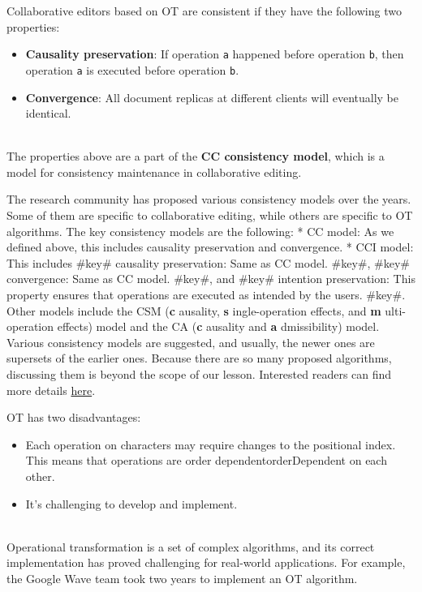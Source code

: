 Collaborative editors based on OT are consistent if they have the following two properties:

\begin{itemize}
\item
\protect{}\label{6J2W0HQeIjtGxqpABTopm}
\textbf{Causality preservation}: If operation \texttt{a} happened before operation \texttt{b}, then operation \texttt{a} is executed before operation \texttt{b}.
\item
\protect{}\label{DgY5Z2OVVujAPT_cXY392}
\textbf{Convergence}: All document replicas at different clients will eventually be identical.
\end{itemize}
\\
The properties above are a part of the \textbf{CC consistency model}, which is a model for consistency maintenance in collaborative editing.

The research community has proposed various consistency models over the years. Some of them are specific to collaborative editing, while others are specific to OT algorithms. The key consistency models are the following: * CC model: As we defined above, this includes causality preservation and convergence. * CCI model: This includes \#key\# causality preservation: Same as CC model. \#key\#, \#key\# convergence: Same as CC model. \#key\#, and \#key\# intention preservation: This property ensures that operations are executed as intended by the users. \#key\#.
\\
Other models include the CSM (\textbf{c} ausality, \textbf{s} ingle-operation effects, and \textbf{m} ulti-operation effects) model and the CA (\textbf{c} ausality and \textbf{a} dmissibility) model.
\\
Various consistency models are suggested, and usually, the newer ones are supersets of the earlier ones. Because there are so many proposed algorithms, discussing them is beyond the scope of our lesson. Interested readers can find more details \href{https://dl.acm.org/doi/pdf/10.1145/289444.289469}{here}.

OT has two disadvantages:

\begin{itemize}
\item
\protect{}\label{AAdxsuJ2sIQBxAqGSMUXD}
Each operation on characters may require changes to the positional index. This means that operations are order dependentorderDependent on each other.
\item
\protect{}\label{aN0EyXL_kcaOIzl_SlCyO}
It's challenging to develop and implement.
\end{itemize}
\\
Operational transformation is a set of complex algorithms, and its correct implementation has proved challenging for real-world applications. For example, the Google Wave team took two years to implement an OT algorithm.

